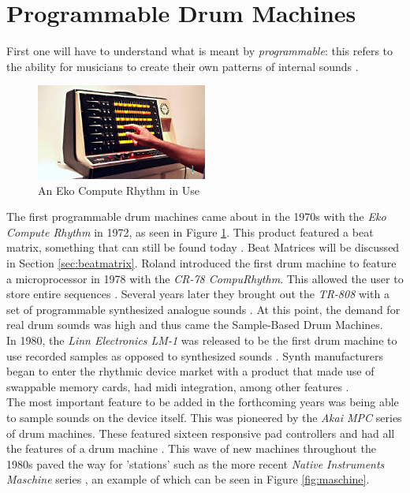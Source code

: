 \documentclass[12pt,a4paper]{report}
\begin{document}
\section{Programmable Drum Machines}
First one will have to understand what is meant by \textit{programmable}: this refers to the ability for musicians to create their own patterns of internal sounds \cite{rhythmart}.\\
\begin{figure}[h!]
	\begin{center}
		\includegraphics[width = 0.5\textwidth, angle=0, origin=c]{computerhythm.jpg}
		\caption{An Eko Compute Rhythm in Use \cite{comprhythImg}}
		\label{fig:comprhyt}
	\end{center}
\end{figure}
The first programmable drum machines came about in the 1970s with the \textit{Eko Compute Rhythm} in 1972, as seen in Figure \ref{fig:comprhyt}. This product featured a beat matrix, something that can still be found today \cite{beatgoeson}. Beat Matrices will be discussed in Section \ref{sec:beatmatrix}. Roland introduced the first drum machine to feature a microprocessor in 1978 with the \textit{CR-78 CompuRhythm}. This allowed the user to store entire sequences \cite{cr78}. Several years later they brought out the \textit{TR-808} with a set of programmable synthesized analogue sounds \cite{tr808, beatgoeson}. At this point, the demand for real drum sounds was high and thus came the Sample-Based Drum Machines.\\
In 1980, the \textit{Linn Electronics LM-1} was released to be the first drum machine to use recorded samples as opposed to synthesized sounds \cite{beatgoeson}. Synth manufacturers began to enter the rhythmic device market with a product that made use of swappable memory cards, had \ac{midi} integration, among other features \cite{rhythmart}.\\
The most important feature to be added in the forthcoming years was being able to sample sounds on the device itself. This was pioneered by the \textit{Akai MPC} series of drum machines. These featured sixteen responsive pad controllers and had all the features of a drum machine \cite{beatgoeson, rhythmart}. This wave of new machines throughout the 1980s paved the way for 'stations' such as the more recent \textit{Native Instruments Maschine} series \cite{rhythmart}, an example of which can be seen in Figure \ref{fig:maschine}.\\
\end{document}
